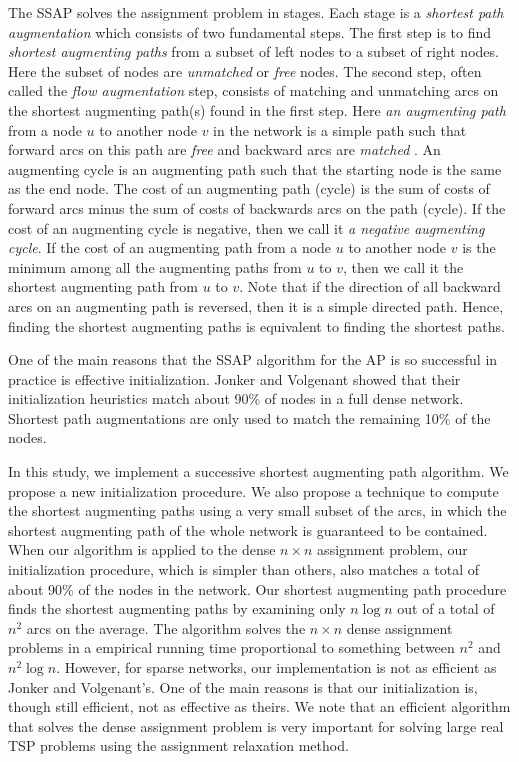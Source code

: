 The SSAP solves the assignment problem in stages. Each stage is
a {\it shortest path augmentation} which consists
of two fundamental steps. The first step is to find
{\it shortest augmenting paths} from a subset of left nodes to a
subset of right nodes. Here the subset of nodes are {\it unmatched}
or {\it free} nodes. The second step, often called the
{\it flow augmentation} step, consists of matching and unmatching arcs
on the shortest augmenting path(s) found in the first step. 
Here {\it an augmenting path}
from a node $u$ to another node $v$ in the network
is a simple path such that forward arcs
on this path are {\it free} and backward arcs are {\it matched }. 
An augmenting cycle is an augmenting
path such that the starting node is the same as the end node. The cost
of an augmenting path (cycle) is the sum of costs of forward arcs minus the
sum of costs of backwards arcs on the path (cycle). If the cost
of an augmenting cycle is negative, then we call it {\it a negative
augmenting cycle}. If the cost of an augmenting path from a node
$u$ to another node $v$ is the minimum among all the augmenting paths from
$u$ to $v$, then we call it the shortest augmenting path from $u$ to $v$.
Note that if the direction of all backward arcs on an augmenting path 
is reversed, then it is a simple directed path.  Hence, finding the 
shortest augmenting paths is equivalent to finding the shortest paths.

One of the main reasons that the SSAP algorithm
for the AP is so successful in practice
is effective initialization.
Jonker and Volgenant \cite{jon1} showed that
their initialization heuristics
match about 90\% of nodes in a full dense network. Shortest
path augmentations are only used to match the remaining 10\% of the nodes.

In this study, we implement a successive shortest
augmenting path algorithm.
We propose a new initialization procedure. We also
propose a technique to compute the shortest augmenting paths using a 
very small subset of the arcs, in which the shortest augmenting
path of the whole network is guaranteed to be contained.
When our algorithm is applied to the dense $n\times n$ assignment problem,
our initialization procedure, which is simpler than others,
also matches a total of about 90\% of the nodes in the network.
Our shortest augmenting path procedure finds the 
shortest augmenting paths by examining only 
$n\log n$ out of a total of $n^2$ arcs on the average.
The algorithm solves 
the $n\times n$ dense assignment problems in a empirical running
time proportional
to something between $n^2$ and $n^2\log n$.
However, for sparse networks, our implementation is not
as efficient as Jonker and Volgenant's. One of the main reasons is
that our initialization is, though still efficient, not
as effective as theirs.
We note that an efficient algorithm that solves
the dense assignment problem is very important
for solving large real TSP problems using the assignment relaxation
method.

